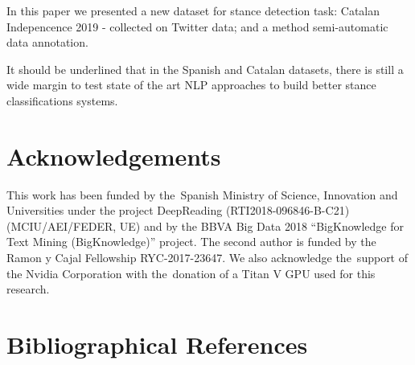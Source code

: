 \documentclass[10pt, a4paper]{article}
\begin{document}
In this paper we presented a new dataset for stance detection task: Catalan Indepencence 2019 - collected on Twitter data; and a method semi-automatic data annotation.  

It should be underlined that in the Spanish and Catalan datasets, there is still a wide margin to test state of the art NLP approaches to build better stance classifications systems.

\section{Acknowledgements}

This work has been funded by the~Spanish Ministry of Science, Innovation and Universities under the project DeepReading (RTI2018-096846-B-C21) (MCIU/AEI/FEDER, UE) and by the BBVA Big Data 2018 ``BigKnowledge for Text Mining (BigKnowledge)'' project. The second author is funded by the Ramon y Cajal Fellowship RYC-2017-23647. We also acknowledge the~support of the Nvidia Corporation with the~donation of a Titan V GPU used for this research.

\section{Bibliographical References}\label{main:ref}





\end{document}
